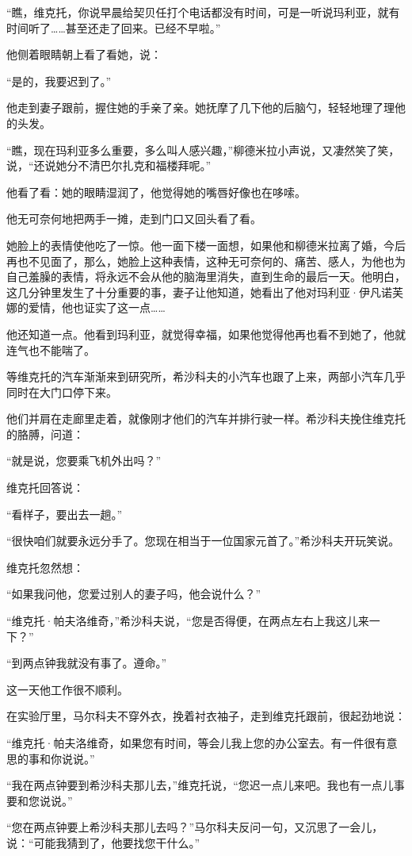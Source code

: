 “瞧，维克托，你说早晨给契贝任打个电话都没有时间，可是一听说玛利亚，就有时间听了……甚至还走了回来。已经不早啦。”

他侧着眼睛朝上看了看她，说：

“是的，我要迟到了。”

他走到妻子跟前，握住她的手亲了亲。她抚摩了几下他的后脑勺，轻轻地理了理他的头发。

“瞧，现在玛利亚多么重要，多么叫人感兴趣，”柳德米拉小声说，又凄然笑了笑，说，“还说她分不清巴尔扎克和福楼拜呢。”

他看了看：她的眼睛湿润了，他觉得她的嘴唇好像也在哆嗦。

他无可奈何地把两手一摊，走到门口又回头看了看。

她脸上的表情使他吃了一惊。他一面下楼一面想，如果他和柳德米拉离了婚，今后再也不见面了，那么，她脸上这种表情，这种无可奈何的、痛苦、感人，为他也为自己羞臊的表情，将永远不会从他的脑海里消失，直到生命的最后一天。他明白，这几分钟里发生了十分重要的事，妻子让他知道，她看出了他对玛利亚·伊凡诺芙娜的爱情，他也证实了这一点……

他还知道一点。他看到玛利亚，就觉得幸福，如果他觉得他再也看不到她了，他就连气也不能喘了。

等维克托的汽车渐渐来到研究所，希沙科夫的小汽车也跟了上来，两部小汽车几乎同时在大门口停下来。

他们并肩在走廊里走着，就像刚才他们的汽车并排行驶一样。希沙科夫挽住维克托的胳膊，问道：

“就是说，您要乘飞机外出吗？”

维克托回答说：

“看样子，要出去一趟。”

“很快咱们就要永远分手了。您现在相当于一位国家元首了。”希沙科夫开玩笑说。

维克托忽然想：

“如果我问他，您爱过别人的妻子吗，他会说什么？”

“维克托·帕夫洛维奇，”希沙科夫说，“您是否得便，在两点左右上我这儿来一下？”

“到两点钟我就没有事了。遵命。”

这一天他工作很不顺利。

在实验厅里，马尔科夫不穿外衣，挽着衬衣袖子，走到维克托跟前，很起劲地说：

“维克托·帕夫洛维奇，如果您有时间，等会儿我上您的办公室去。有一件很有意思的事和你说说。”

“我在两点钟要到希沙科夫那儿去，”维克托说，“您迟一点儿来吧。我也有一点儿事要和您说说。”

“您在两点钟要上希沙科夫那儿去吗？”马尔科夫反问一句，又沉思了一会儿，说：“可能我猜到了，他要找您干什么。”

